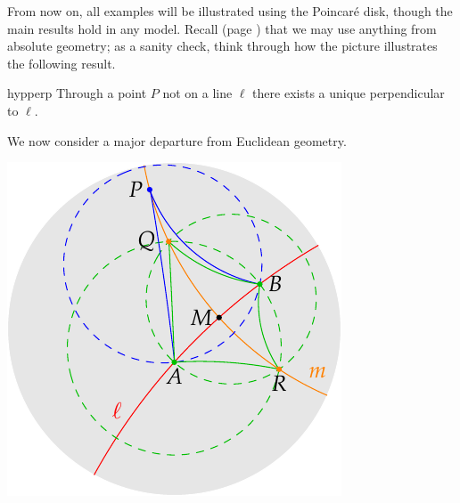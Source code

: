 \begin{minipage}[t]{0.68\linewidth}\vspace{-8pt}
	From now on, all examples will be illustrated using the Poincaré disk, though the main results hold in any model. Recall (page \pageref{sec:hyp1}) that we may use anything from absolute geometry; as a sanity check, think through how the picture illustrates the following result.
	
	\begin{lemm}{}{hypperp}
		Through a point $P$ not on a line $\ell$ there exists a unique perpendicular to $\ell$. 
	\end{lemm}
	
	We now consider a major departure from Euclidean geometry.
\end{minipage}
\hfill
\begin{minipage}[t]{0.3\linewidth}\vspace{-28pt}
	\flushright\includegraphics[scale=0.75]{basic-perp}
\end{minipage}

